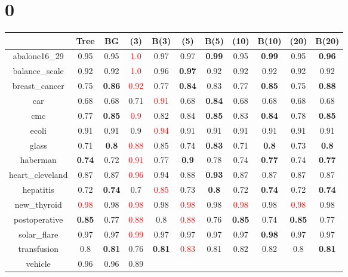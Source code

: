 \documentclass{article}%
\begin{document}
%
\normalsize%
\section*{0}%
\begin{tabular}{c|cccccccccc}%
\hline%
&Tree&BG&(3)&B(3)&(5)&B(5)&(10)&B(10)&(20)&B(20)\\%
\hline%
abalone16\_29&0.95&0.95&\textcolor{red}{ 
1.0
}&0.97&0.97&\textbf{0.99}&0.95&\textbf{0.99}&0.95&\textbf{0.96}\\%
\hline%
balance\_scale&0.92&0.92&\textcolor{red}{ 
1.0
}&0.96&\textbf{0.97}&0.92&0.92&0.92&0.92&0.92\\%
\hline%
breast\_cancer&0.75&\textbf{0.86}&\textcolor{red}{ 
0.92
}&0.77&\textbf{0.84}&0.83&0.77&\textbf{0.85}&0.75&\textbf{0.88}\\%
\hline%
car&0.68&0.68&0.71&\textcolor{red}{ 
0.91
}&0.68&\textbf{0.84}&0.68&0.68&0.68&0.68\\%
\hline%
cmc&0.77&\textbf{0.85}&\textcolor{red}{ 
0.9
}&0.82&0.84&\textbf{0.85}&0.83&\textbf{0.84}&0.78&\textbf{0.85}\\%
\hline%
ecoli&0.91&0.91&0.9&\textcolor{red}{ 
0.94
}&0.91&0.91&0.91&0.91&0.91&0.91\\%
\hline%
glass&0.71&\textbf{0.8}&\textcolor{red}{ 
0.88
}&0.85&0.74&\textbf{0.83}&0.71&\textbf{0.8}&0.73&\textbf{0.8}\\%
\hline%
haberman&\textbf{0.74}&0.72&\textcolor{red}{ 
0.91
}&0.77&\textbf{0.9}&0.78&0.74&\textbf{0.77}&0.74&\textbf{0.77}\\%
\hline%
heart\_cleveland&0.87&0.87&\textcolor{red}{ 
0.96
}&0.94&0.88&\textbf{0.93}&0.87&0.87&0.87&0.87\\%
\hline%
hepatitis&0.72&\textbf{0.74}&0.7&\textcolor{red}{ 
0.85
}&0.73&\textbf{0.8}&0.72&\textbf{0.74}&0.72&\textbf{0.74}\\%
\hline%
new\_thyroid&\textcolor{red}{ 
0.98
}&0.98&\textcolor{red}{ 
0.98
}&0.98&\textcolor{red}{ 
0.98
}&0.98&\textcolor{red}{ 
0.98
}&0.98&\textcolor{red}{ 
0.98
}&0.98\\%
\hline%
postoperative&\textbf{0.85}&0.77&\textcolor{red}{ 
0.88
}&0.8&\textcolor{red}{ 
0.88
}&0.76&\textbf{0.85}&0.74&\textbf{0.85}&0.77\\%
\hline%
solar\_flare&0.97&0.97&\textcolor{red}{ 
0.99
}&0.97&0.97&0.97&0.97&\textbf{0.98}&0.97&0.97\\%
\hline%
transfusion&0.8&\textbf{0.81}&0.76&\textbf{0.81}&\textcolor{red}{ 
0.83
}&0.81&0.82&0.82&0.8&\textbf{0.81}\\%
\hline%
vehicle&0.96&0.96&0.89&\textcolor{red}{ 
}
\end{tabular}
\end{document}
